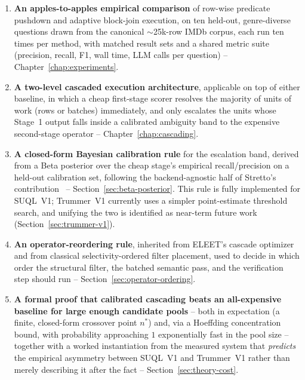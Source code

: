\begin{enumerate}
  \item \textbf{An apples-to-apples empirical comparison} of row-wise
        predicate pushdown and adaptive block-join execution, on ten
        held-out, genre-diverse questions drawn from the canonical
        $\sim$25k-row IMDb corpus, each run ten times per method, with
        matched result sets and a shared metric suite (precision,
        recall, F1, wall time, LLM calls per question) --
        Chapter~\ref{chap:experiments}.
  \item \textbf{A two-level cascaded execution architecture}, applicable
        on top of either baseline, in which a cheap first-stage scorer
        resolves the majority of units of work (rows or batches)
        immediately, and only escalates the units whose Stage~1 output
        falls inside a calibrated ambiguity band to the expensive
        second-stage operator -- Chapter~\ref{chap:cascading}.
  \item \textbf{A closed-form Bayesian calibration rule} for the
        escalation band, derived from a Beta posterior over the cheap
        stage's empirical recall/precision on a held-out calibration
        set, following the backend-agnostic half of Stretto's
        contribution~\cite{stretto} -- Section~\ref{sec:beta-posterior}.
        This rule is fully implemented for SUQL~V1; Trummer~V1
        currently uses a simpler point-estimate threshold search, and
        unifying the two is identified as near-term future work
        (Section~\ref{sec:trummer-v1}).
  \item \textbf{An operator-reordering rule}, inherited from ELEET's
        cascade optimizer~\cite{eleet} and from classical
        selectivity-ordered filter placement, used to decide in which
        order the structural filter, the batched semantic pass, and the
        verification step should run -- Section~\ref{sec:operator-ordering}.
  \item \textbf{A formal proof that calibrated cascading beats an
        all-expensive baseline for large enough candidate pools} -- both
        in expectation (a finite, closed-form crossover point $n^\ast$)
        and, via a Hoeffding concentration bound, with probability
        approaching $1$ exponentially fast in the pool size -- together
        with a worked instantiation from the measured system that
        \emph{predicts} the empirical asymmetry between SUQL~V1 and
        Trummer~V1 rather than merely describing it after the fact --
        Section~\ref{sec:theory-cost}.

\end{enumerate}
